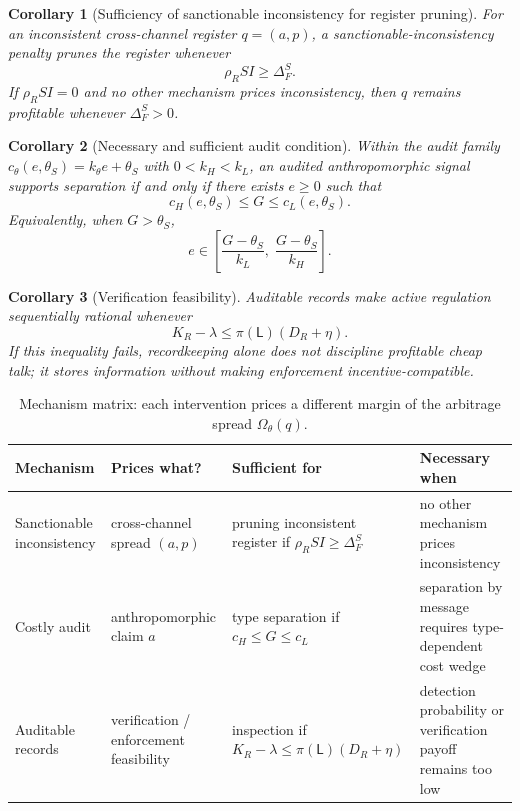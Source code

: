 \documentclass[review,authoryear]{elsarticle}
\newtheorem{corollary}{Corollary}
\theoremstyle{definition}
\theoremstyle{plain}
\begin{document}
\begin{corollary}[Sufficiency of sanctionable inconsistency for register pruning]
\label{cor:inconsistency-pruning}
For an inconsistent cross-channel register $q=(a,p)$, a
sanctionable-inconsistency penalty prunes the register whenever
\[
\rho_R SI \ge \Delta_F^S.
\]
If $\rho_R SI=0$ and no other mechanism prices inconsistency, then $q$
remains profitable whenever $\Delta_F^S>0$.
\end{corollary}

\begin{corollary}[Necessary and sufficient audit condition]
\label{cor:audit-separation}
Within the audit family $c_\theta(e,\theta_S)=k_\theta e+\theta_S$ with
$0<k_H<k_L$, an audited anthropomorphic signal supports separation if and
only if there exists $e\ge 0$ such that
\[
c_H(e,\theta_S)\le G\le c_L(e,\theta_S).
\]
Equivalently, when $G>\theta_S$,
\[
e\in
\left[
\frac{G-\theta_S}{k_L},\;
\frac{G-\theta_S}{k_H}
\right].
\]
\end{corollary}

\begin{corollary}[Verification feasibility]
\label{cor:verification-feasibility}
Auditable records make active regulation sequentially rational whenever
\[
K_R-\lambda \le \pi(\mathsf{L})(D_R+\eta).
\]
If this inequality fails, recordkeeping alone does not discipline profitable
cheap talk; it stores information without making enforcement
incentive-compatible.
\end{corollary}

\begin{table}[t]
\centering
\small
\setlength{\tabcolsep}{3pt}
\renewcommand{\arraystretch}{1.3}
\begin{tabular}{@{}p{3.2cm}p{3.2cm}p{3.5cm}p{3.5cm}@{}}
\toprule
\textbf{Mechanism} & \textbf{Prices what?} & \textbf{Sufficient for} & \textbf{Necessary when} \\
\midrule
Sanctionable inconsistency & cross-channel spread $(a,p)$ & pruning inconsistent register if $\rho_R SI\ge\Delta_F^S$ & no other mechanism prices inconsistency \\
Costly audit & anthropomorphic claim $a$ & type separation if $c_H\le G\le c_L$ & separation by message requires type-dependent cost wedge \\
Auditable records & verification / enforcement feasibility & inspection if $K_R{-}\lambda\le\pi(\mathsf{L})(D_R{+}\eta)$ & detection probability or verification payoff remains too low \\
\bottomrule
\end{tabular}
\caption{Mechanism matrix: each intervention prices a different margin of the
arbitrage spread $\Omega_\theta(q)$.}
\label{tab:mechanism-matrix}
\end{table}
\end{document}
